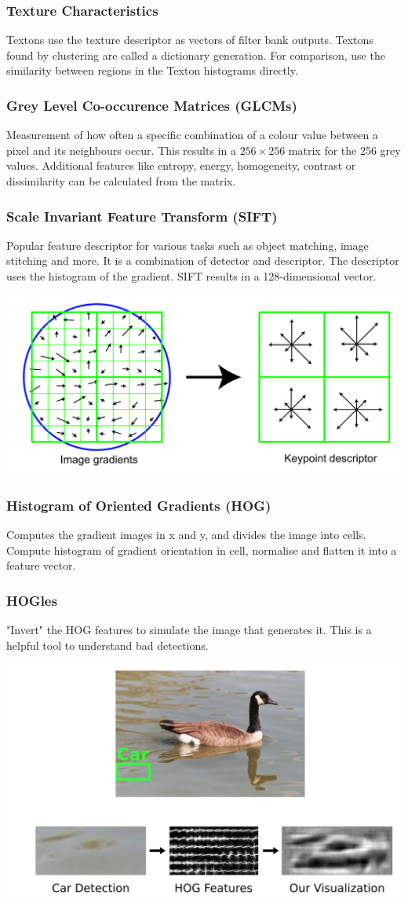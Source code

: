 \subsubsection{Texture Characteristics}
Textons use the texture descriptor as vectors of filter bank outputs. Textons found by clustering are called a dictionary generation.
For comparison, use the similarity between regions in the Texton histograms directly.

\subsubsection{Grey Level Co-occurence Matrices (GLCMs)}
Measurement of how often a specific combination of a colour value between a pixel and its neighbours occur.
This results in a $256\times 256$ matrix for the 256 grey values.
Additional features like entropy, energy, homogeneity, contrast or dissimilarity can be calculated from the matrix.

\subsubsection{Scale Invariant Feature Transform (SIFT)}
Popular feature descriptor for various tasks such as object matching, image stitching and more.
It is a combination of detector and descriptor. The descriptor uses the histogram of the gradient.
SIFT results in a 128-dimensional vector.
\begin{center}
	\includegraphics[width=0.6\linewidth]{img/SIFT}
\end{center}

\subsubsection{Histogram of Oriented Gradients (HOG)}
Computes the gradient images in x and y, and divides the image into cells.
Compute histogram of gradient orientation in cell, normalise and flatten it into a feature vector.

\subsubsection{HOGles}
"Invert" the HOG features to simulate the image that generates it. This is a helpful tool to understand bad detections.

\begin{center}
	\includegraphics[width=0.6\linewidth]{img/HOGles}
\end{center}
